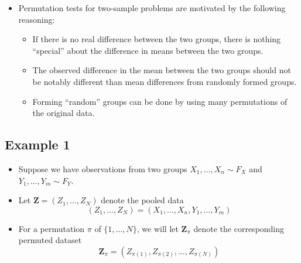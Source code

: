\documentclass[]{book}
\providecommand{\tightlist}{%
  \setlength{\itemsep}{0pt}\setlength{\parskip}{0pt}}
\begin{document}
\begin{itemize}
\tightlist
\item
  Permutation tests for two-sample problems are motivated by the following reasoning:

  \begin{itemize}
  \tightlist
  \item
    If there is no real difference between the two groups,
    there is nothing ``special'' about the difference in means
    between the two groups.
  \item
    The observed difference in the mean between the two groups
    should not be notably different than mean differences from
    randomly formed groups.
  \item
    Forming ``random'' groups can be done by using many permutations
    of the original data.
  \end{itemize}
\end{itemize}

\hypertarget{example-1}{%
\subsection{Example 1}\label{example-1}}

\begin{itemize}
\item
  Suppose we have observations from two groups \(X_{1}, \ldots, X_{n} \sim F_{X}\)
  and \(Y_{1}, \ldots, Y_{m} \sim F_{Y}\).
\item
  Let \(\mathbf{Z} = (Z_{1}, \ldots, Z_{N})\) denote the pooled data
  \begin{equation}
  (Z_{1}, \ldots, Z_{N}) = (X_{1}, \ldots, X_{n}, Y_{1}, \ldots, Y_{m})
  \end{equation}
\item
  For a permutation \(\pi\) of \(\{1, \ldots, N\}\), we will let \(\mathbf{Z}_{\pi}\)
  denote the corresponding permuted dataset
  \begin{equation}
  \mathbf{Z}_{\pi} = (Z_{\pi(1)}, Z_{\pi(2)}, \ldots, Z_{\pi(N)})
  \end{equation}
\end{itemize}
\end{document}
